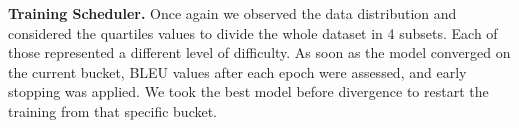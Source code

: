 
\noindent\textbf{Training Scheduler.} Once again we observed the data distribution and considered the quartiles values
to divide the whole dataset in 4 subsets. Each of those represented a different level of difficulty.
As soon as the model converged on the current bucket, BLEU values after each epoch were assessed,
and early stopping was applied. We took the best model before divergence to restart the training 
from that specific bucket. 









